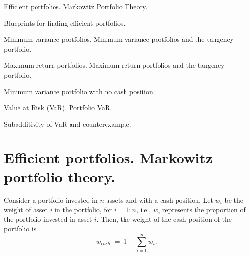 
\noindent Efficient portfolios. Markowitz Portfolio Theory.
\medskip

\noindent Blueprints for finding efficient portfolios.
\medskip

\noindent Minimum variance portfolios. Minimum variance portfolios and the tangency
portfolio.
\medskip

\noindent Maximum return portfolios. Maximum return portfolios and the tangency
portfolio.
\medskip

\noindent Minimum variance portfolio with no cash position.
\medskip

\noindent Value at Risk (VaR). Portfolio VaR.
\medskip

\noindent Subadditivity of VaR and counterexample.
\medskip

\section{Efficient portfolios. Markowitz portfolio theory.}

Consider a portfolio invested in $n$ assets and with a cash position. Let $w_i$ be the
weight of asset $i$ in the portfolio, for $i = 1:n$, i.e., $w_i$ represents the
proportion of the portfolio invested in asset $i$. Then, the weight of the cash
position of the portfolio is
\begin{equation}
w_{cash} \;=\; 1 - \sum_{i=1}^n w_i.
\end{equation}

